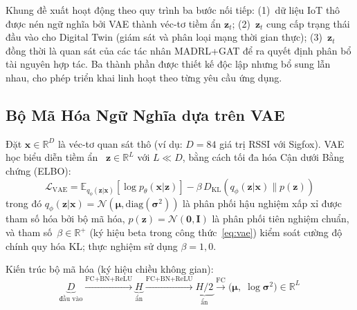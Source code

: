 \documentclass[conference]{IEEEtran}
\begin{document}
Khung đề xuất hoạt động theo quy trình ba bước nối tiếp:
(1)~dữ liệu IoT thô được nén ngữ nghĩa bởi VAE thành véc-tơ
tiềm ẩn $\mathbf{z}_t$; (2)~$\mathbf{z}_t$ cung cấp trạng thái
đầu vào cho Digital Twin (giám sát và phân loại mạng thời gian
thực); (3)~$\mathbf{z}_t$ đồng thời là quan sát của các tác
nhân MADRL+GAT để ra quyết định phân bổ tài nguyên hợp tác.
Ba thành phần được thiết kế độc lập nhưng bổ sung lẫn nhau,
cho phép triển khai linh hoạt theo từng yêu cầu ứng dụng.


\subsection{Bộ Mã Hóa Ngữ Nghĩa dựa trên VAE}
\label{subsec:vae}

Đặt $\mathbf{x} \in \mathbb{R}^D$ là véc-tơ quan sát thô (ví dụ:
$D = 84$ giá trị RSSI với Sigfox). VAE học biểu diễn tiềm ẩn~%
$\mathbf{z} \in \mathbb{R}^L$ với $L \ll D$, bằng cách tối đa hóa
Cận dưới Bằng chứng (ELBO):
\begin{equation}
  \mathcal{L}_{\text{VAE}} = \mathbb{E}_{q_\phi(\mathbf{z}|\mathbf{x})}
  [\log p_\theta(\mathbf{x}|\mathbf{z})]
  - \beta\, D_{\text{KL}}(q_\phi(\mathbf{z}|\mathbf{x}) \| p(\mathbf{z}))
  \label{eq:vae}
\end{equation}
trong đó $q_\phi(\mathbf{z}|\mathbf{x}) = \mathcal{N}(\boldsymbol{\mu},
\text{diag}(\boldsymbol{\sigma}^2))$ là phân phối hậu nghiệm xấp
xỉ được tham số hóa bởi bộ mã hóa, $p(\mathbf{z}) = \mathcal{N}(\mathbf{0},
\mathbf{I})$ là phân phối tiên nghiệm chuẩn, và tham số~$\beta \in \mathbb{R}^{+}$ (ký hiệu beta trong công thức~\eqref{eq:vae})
kiểm soát cường độ chính quy hóa KL; thực nghiệm sử dụng $\beta = 1{,}0$.

Kiến trúc bộ mã hóa (ký hiệu chiều không gian):
\begin{equation}
  \underbrace{D}_{\text{đầu vào}}
  \xrightarrow{\text{FC+BN+ReLU}}
  \underbrace{H}_{\text{ẩn}}
  \xrightarrow{\text{FC+BN+ReLU}}
  \underbrace{H/2}_{\text{ẩn}}
  \xrightarrow{\text{FC}}
  \bigl(\boldsymbol{\mu},\;\log\boldsymbol{\sigma}^2\bigr)
  \in \mathbb{R}^{L}
  \label{eq:encoder_arch}
\end{equation}
\end{document}
